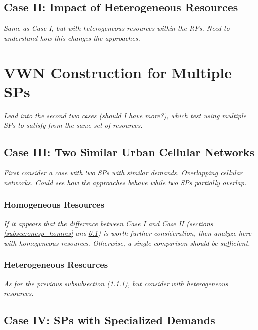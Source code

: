 \documentclass[12pt,dvipsnames]{report}
\begin{document}
\subsection{Case II: Impact of Heterogeneous Resources} \label{subsec:onesp_hetres}

\textit{Same as Case I, but with heterogeneous resources within the RPs.  Need to understand how this changes the approaches.}

\section{VWN Construction for Multiple SPs} \label{sec:mulsp}

\textit{Lead into the second two cases (should I have more?), which test using multiple SPs to satisfy from the same set of resources.}

\subsection{Case III: Two Similar Urban Cellular Networks} \label{subsec:mulsp_sim}

\textit{First consider a case with two SPs with similar demands.  Overlapping cellular networks.  Could see how the approaches behave while two SPs partially overlap.}

\subsubsection{Homogeneous Resources} \label{subsubsec:mulsp_sim_homres}

\textit{If it appears that the difference between Case I and Case II (sections \ref{subsec:onesp_homres} and \ref{subsec:onesp_hetres}) is worth further consideration, then analyze here with homogeneous resources.  Otherwise, a single comparison should be sufficient.}

\subsubsection{Heterogeneous Resources} \label{subsubsec:mulsp_sim_hetres}

\textit{As for the previous subsubsection (\ref{subsubsec:mulsp_sim_homres}), but consider with heterogeneous resources.}

\subsection{Case IV: SPs with Specialized Demands} \label{subsec:mulsp_spec}
\end{document}
